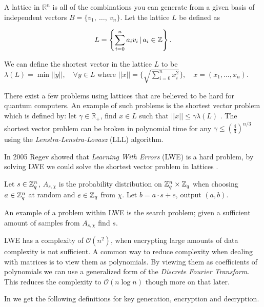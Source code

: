 \begin{definition}
    A lattice in $\mathbb{R}^n$ is all of the combinations you can generate
    from a given basis of independent vectors $B = \{v_1,\ \ldots,\ v_n\}$. Let
    the lattice $L$ be defined as

    \[L = \left\{ \sum_{i = 0}^n a_iv_i \, | \, a_i \in \mathbb{Z} \right\}.\]
\end{definition}


We can define the shortest vector in the lattice $L$ to be
$\lambda(L) = \min || y ||, \quad \forall y \in L$ where
$||x|| = \{\sqrt{\sum_{i=0}^n x^2_i}\}, \quad x = (x_1, \ldots, x_n)$.

There exist a few problems using lattices that are believed to be hard for
quantum computers. An example of such problems is the shortest vector problem
which is defined by: let $\gamma \in \mathbb{R}_+$, find $x \in L$ such that
$||x|| \leq \gamma \lambda(L)$ \citep{ajtai1998shortest}. The shortest vector
problem can be broken in polynomial time for any $\gamma \leq
(\frac{4}{3})^{n/3}$ using the \textit{Lenstra-Lenstra-Lovasz} (LLL) algorithm.


In 2005 Regev showed that \textit{Learning With Errors} (LWE) is a hard
problem, by solving LWE we could solve the shortest vector problem in lattices
\citep{Regev05}.


\begin{definition}

    Let $s \in \mathbb{Z}^n_q$, $A_{s, \chi}$ is the probability distribution on
    $\mathbb{Z}^n_q \times \mathbb{Z}_q$ when choosing $a \in \mathbb{Z}^n_q$ at random and $e \in
    \mathbb{Z}_q$ from $\chi$. Let $b = a \cdot s + e$, output $(a,b)$.


\end{definition}

An example of a problem within LWE is the search problem; given a sufficient
amount of samples from $A_{s, \chi}$ find $s$.

LWE has a complexity of $\mathcal{O}(n^2)$, when encrypting large amounts of
data complexity is not sufficient. A common way to reduce complexity when
dealing with matrices is to view them as polynomials. By viewing them as
coefficients of polynomials we can use a generalized form of the
\textit{Discrete Fourier Transform}. This reduces the complexity to
$\mathcal{O}(n \log n)$ though more on that later.

In \citep{FPGA_Post_Quantum_Primitives} we get the following definitions for key
generation, encryption and decryption.

